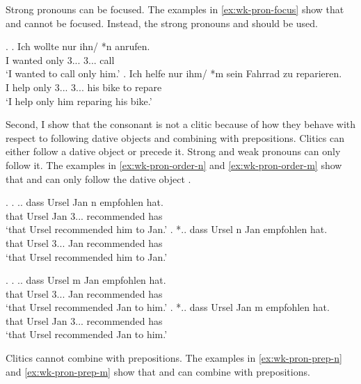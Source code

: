 Strong pronouns can be focused.
The examples in \ref{ex:wk-pron-focus} show that  and  cannot be focused.
Instead, the strong pronouns  and  should be used.

\ex.\label{ex:wk-pron-focus}
\ag. Ich wollte nur ihn/ *n anrufen.\\
 I wanted only 3... 3... call\\
 `I wanted to call only him.'
\bg. Ich helfe nur ihm/ *m sein Fahrrad zu reparieren.\\
 I help only 3... 3... his bike to repare\\
 `I help only him reparing his bike.'

Second, I show that the consonant is not a clitic because of how they behave with respect to following dative objects and combining with prepositions.
Clitics can either follow a dative object or precede it. Strong and weak pronouns can only follow it.
The examples in \ref{ex:wk-pron-order-n} and \ref{ex:wk-pron-order-m} show that  and  can only follow the dative object .

\ex.\label{ex:wk-pron-order-n}
\ag. .. dass Ursel Jan n empfohlen hat.\\
 {} that Ursel Jan 3... recommended has\\
 `that Ursel recommended him to Jan.'
\bg. *.. dass Ursel n Jan empfohlen hat.\\
{} that Ursel 3... Jan recommended has\\
`that Ursel recommended him to Jan.'

\ex.\label{ex:wk-pron-order-m}
\ag. .. dass Ursel m Jan empfohlen hat.\\
 {} that Ursel 3... Jan recommended has\\
 `that Ursel recommended Jan to him.'
\bg. *.. dass Ursel Jan m empfohlen hat.\\
{} that Ursel Jan 3... recommended has\\
`that Ursel recommended Jan to him.'

Clitics cannot combine with prepositions.
The examples in \ref{ex:wk-pron-prep-n} and \ref{ex:wk-pron-prep-m} show that  and  can combine with prepositions.

